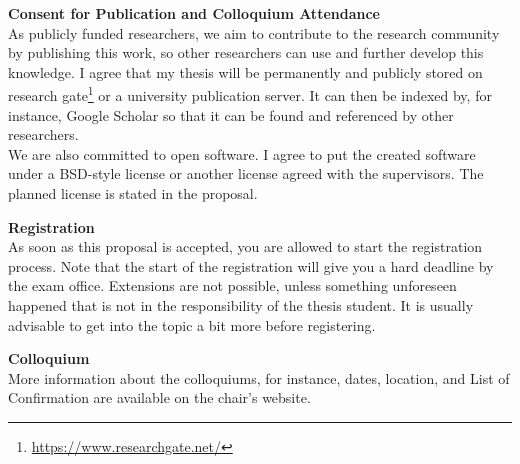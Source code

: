 \documentclass[a4paper]{article}
\begin{document}

\def\bibpreamble{Reference all sources that are cited in your proposal using, e.g., the APA, Harvard, or IEEE style.}
\nocite{*}

\newpage
\begin{flushleft}
    {\Large{\textbf{Consent for Publication and Colloquium Attendance}}}\\
    \bigskip 
    As publicly funded researchers, we aim to contribute to the research community by publishing this work, so other researchers can use and further develop this knowledge. I agree that my thesis will be permanently and publicly stored on research gate\footnote{\url{https://www.researchgate.net/}} or a university publication server. It can then be indexed by, for instance, Google Scholar so that it can be found and referenced by other researchers.\\
    
    We are also committed to open software. I agree to put the created software under a BSD-style license or another license agreed with the supervisors. The planned license is stated in the proposal.\\

         
\end{flushleft}
\vspace{0.4cm}
\noindent{}
\bigskip
\begin{flushleft}
	{\Large{\textbf{Registration}}}\\
	\bigskip 
	As soon as this proposal is accepted, you are allowed to start the registration process. Note that the start of the registration will give you a hard deadline by the exam office. Extensions are not possible, unless something unforeseen happened that is not in the responsibility of the thesis student. It is usually advisable to get into the topic a bit more before registering.
\end{flushleft}
\bigskip
\begin{flushleft}
	{\Large{\textbf{Colloquium}}}\\
	\bigskip 
	More information about the colloquiums, for instance, dates, location, and List of Confirmation are available on the chair's website.
\end{flushleft}
\end{document}
